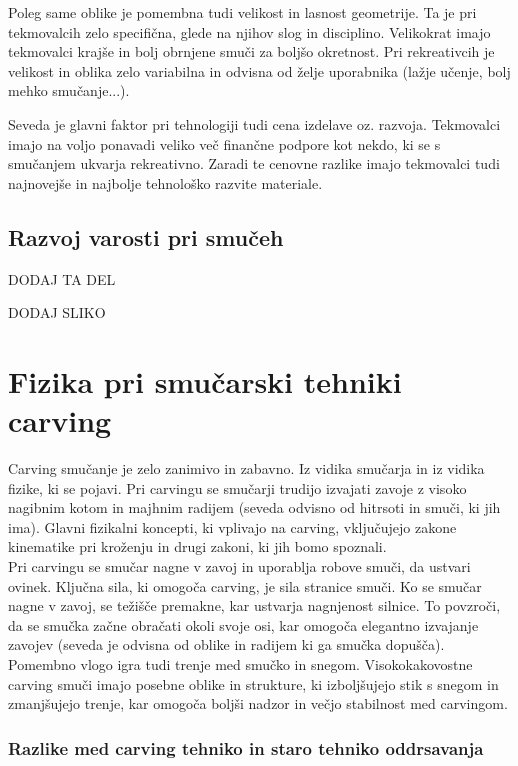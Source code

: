 \documentclass{article}
\begin{document}
Poleg same oblike je pomembna tudi velikost in lasnost geometrije. Ta je pri tekmovalcih zelo specifična, glede na njihov slog in disciplino.
Velikokrat imajo tekmovalci krajše in bolj obrnjene smuči za boljšo okretnost.
Pri rekreativcih je velikost in oblika zelo variabilna in odvisna od želje uporabnika (lažje učenje, bolj mehko smučanje...).

Seveda je glavni faktor pri tehnologiji tudi cena izdelave oz. razvoja. Tekmovalci imajo na voljo ponavadi veliko več finančne podpore kot nekdo, ki se s smučanjem ukvarja rekreativno.
Zaradi te cenovne razlike imajo tekmovalci tudi najnovejše in najbolje tehnološko razvite materiale.
\subsection*{Razvoj varosti pri smučeh}
DODAJ TA DEL

DODAJ SLIKO
\pagebreak

\section{Fizika pri smučarski tehniki carving}

Carving smučanje je zelo zanimivo in zabavno. Iz vidika smučarja in iz vidika fizike, ki se pojavi.
Pri carvingu se smučarji trudijo izvajati zavoje z visoko nagibnim kotom in majhnim radijem (seveda odvisno od hitrsoti in smuči, ki jih ima). 
Glavni fizikalni koncepti, ki vplivajo na carving, vključujejo zakone kinematike pri kroženju in drugi zakoni, ki jih bomo spoznali. \\ \newline
Pri carvingu se smučar nagne v zavoj in uporablja robove smuči, da ustvari ovinek. Ključna sila, 
ki omogoča carving, je sila stranice smuči. Ko se smučar nagne v zavoj, se težišče premakne, kar ustvarja nagnjenost silnice. 
To povzroči, da se smučka začne obračati okoli svoje osi, kar omogoča elegantno izvajanje zavojev (seveda je odvisna od oblike in radijem ki ga smučka dopušča).\\ \newline
Pomembno vlogo igra tudi trenje med smučko in snegom. Visokokakovostne carving smuči imajo posebne oblike in strukture, 
ki izboljšujejo stik s snegom in zmanjšujejo trenje, kar omogoča boljši nadzor in večjo stabilnost med carvingom.

\subsubsection*{Razlike med carving tehniko in staro tehniko oddrsavanja}
\end{document}
